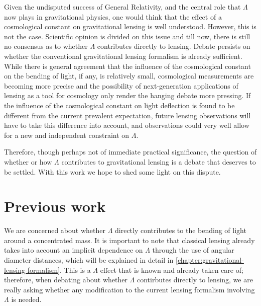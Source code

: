 Given the undisputed success of General Relativity, and the central role that $\Lambda$ now plays in gravitational physics, one would think that the effect of a cosmological constant on gravitational lensing is well understood. However, this is not the case. Scientific opinion is divided on this issue and till now, there is still no consensus as to whether $\Lambda$ contributes directly to lensing. Debate persists on whether the conventional gravitational lensing formalism is already sufficient. While there is general agreement that the influence of the cosmological constant on the bending of light, if any, is relatively small, cosmological measurements are becoming more precise and the possibility of next-generation applications of lensing as a tool for cosmology only render the hanging debate more pressing. If the influence of the cosmological constant on light deflection is found to be different from the current prevalent expectation, future lensing observations will have to take this difference into account, and observations could very well allow for a new and independent constraint on $\Lambda$. 

Therefore, though perhaps not of immediate practical significance, the question of whether or how $\Lambda$ contributes to gravitational lensing is a debate that deserves to be settled. With this work we hope to shed some light on this dispute. 



\section{Previous work}

We are concerned about whether $\Lambda$ directly contributes to the bending of light around a concentrated mass. It is important to note that classical lensing already takes into account an implicit dependence on $\Lambda$ through the use of angular diameter distances, which will be explained in detail in \autoref{chapter:gravitational-lensing-formalism}. This is a $\Lambda$ effect that is known and already taken care of; therefore, when debating about whether $\Lambda$ contirbutes directly to lensing, we are really asking whether any modification to the current lensing formalism involving $\Lambda$ is needed. 

